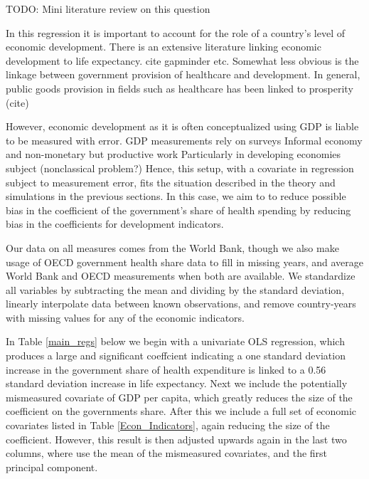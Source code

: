 \documentclass[12pt]{article}
\begin{document}
        TODO: Mini literature review on this question

        In this regression it is important to account for the role of a country's level of economic development. There is an extensive literature linking economic development to life expectancy. cite gapminder etc. Somewhat less obvious is the linkage between government provision of healthcare and development. In general, public goods provision in fields such as healthcare has been linked to prosperity (cite)

        However, economic development as it is often conceptualized using GDP is liable to be measured with error.
        GDP measurements rely on surveys
        Informal economy and non-monetary but productive work
        Particularly in developing economies subject (nonclassical problem?)
        Hence, this setup, with a covariate in regression subject to measurement error, fits the situation described in the theory and simulations in the previous sections. In this case, we aim to to reduce possible bias in the coefficient of the government's share of health spending by reducing bias in the coefficients for development indicators.



        Our data on all measures comes from the World Bank, though we also make usage of OECD government health share data to fill in missing years, and average World Bank and OECD measurements when both are available. We standardize all variables by subtracting the mean and dividing by the standard deviation, linearly interpolate data between known observations, and remove country-years with missing values for any of the economic indicators.


        In Table \ref{main_regs} below we begin with a univariate OLS regression, which produces a large and significant coeffcient indicating a one standard deviation increase in the government share of health expenditure is linked to a 0.56 standard deviation increase in life expectancy. Next we include the potentially mismeasured covariate of GDP per capita, which greatly reduces the size of the coefficient on the governments share. After this we include a full set of economic covariates listed in Table \ref{Econ_Indicators}, again reducing the size of the coefficient. However, this result is then adjusted upwards again in the last two columns, where use the mean of the mismeasured covariates, and the first principal component.
\end{document}
